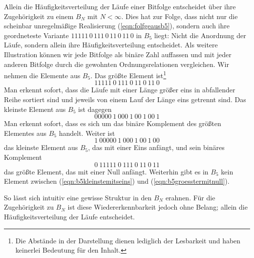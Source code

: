 \documentclass[11pt,a4paper]{scrartcl}
\theoremstyle{plain}
\theoremstyle{definition}
\theoremstyle{remark}
\begin{document}
Allein die Häufigkeitsverteilung der Läufe einer Bitfolge entscheidet
über ihre Zugehörigkeit zu einem $B_N$ mit $N<\infty$. Dies hat zur
Folge, dass nicht nur die scheinbar unregelmäßige Realisierung
(\ref{eqn:folfgeausb5}), sondern auch ihre geordneteste Variante
$11111\,0\,111\,0\,11\,0\,11\,0$ in $B_5$ liegt: Nicht die
Anordnung der Läufe, sondern allein ihre Häufigkeitsverteilung
entscheidet. Als weitere Illustration können wir jede Bitfolge
als binäre Zahl auffassen und mit jeder anderen Bitfolge durch die
gewohnten Ordnungsrelationen vergleichen. Wir nehmen die Elemente aus
$B_5$. Das größte Element ist\footnote{Die Abstände in der Darstellung
dienen lediglich der Lesbarkeit und haben keinerlei Bedeutung für den
Inhalt.}
\begin{equation}
  11111\ 0\ 111\ 0\ 11\ 0\ 11\ 0
\end{equation}
Man erkennt sofort, dass die Läufe mit einer Länge größer eins in
abfallender Reihe sortiert sind und jeweils von einem Lauf der Länge
eins getrennt sind. Das kleinste Element aus $B_5$ ist dagegen
\begin{equation}
  00000\ 1\ 000\ 1\ 00\ 1\ 00\ 1
\end{equation}
Man erkennt sofort, dass es sich um das binäre Komplement des größten
Elementes aus $B_5$ handelt. Weiter ist
\begin{equation}\label{eqn:b5kleinstemitseins}
  1\ 00000\ 1\ 000\ 1\ 00\ 1\ 00
\end{equation}
das kleinste Element aus $B_5$, das mit einer Eins anfängt, und sein
binäres Komplement
\begin{equation}\label{eqn:b5groesstermitnull}
  0\ 11111\ 0\ 111\ 0\ 11\ 0\ 11
\end{equation}
das größte Element, das mit einer Null anfängt. Weiterhin gibt es in
$B_5$ kein Element zwischen (\ref{eqn:b5kleinstemitseins}) und
(\ref{eqn:b5groesstermitnull}).

\noindent So lässt sich intuitiv eine gewisse Struktur in den $B_N$
erahnen. Für die Zugehörigkeit zu $B_N$ ist diese Wiedererkennbarkeit
jedoch ohne Belang; allein die Häufigkeitsverteilung der Läufe
entscheidet.
\end{document}
